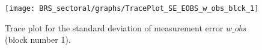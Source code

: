 \begin{figure}[H]
\centering
  \texttt{[image: BRS\_sectoral/graphs/TracePlot\_SE\_EOBS\_w\_obs\_blck\_1]}\\
    \caption{Trace plot for the standard deviation of measurement error $w\_obs$ (block number 1).}
\end{figure}
